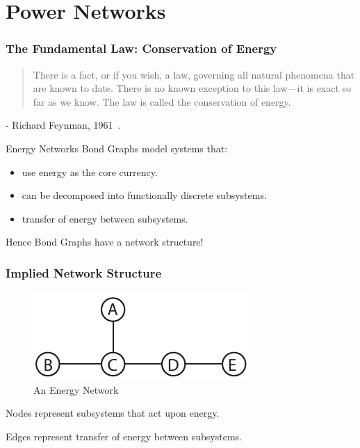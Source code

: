 \section{Power Networks}
\begin{frame}
\frametitle{The Fundamental Law: Conservation of Energy}
\begin{quotation}
	There is a fact, or if you wish, a law, governing all natural phenomena that are known to date. There is no known exception to this law—it is exact so far as we know. The law is called the conservation of energy.
\end{quotation}

- Richard Feynman, 1961~\cite{Feynman1961}.
\end{frame}
\begin{frame}{Energy Networks}
Bond Graphs model systems that:
\begin{itemize}
	\item use energy as the core currency.
	\item can be decomposed into functionally discrete subsystems.
	\item transfer of energy between subsystems.
\end{itemize}
\vspace{1cm}
Hence Bond Graphs have a network structure!
\end{frame}
\begin{frame}
\frametitle{Implied Network Structure}
\begin{figure}
	\centering
	\includegraphics{network_1.pdf}
	\caption{An Energy Network}
\end{figure}
Nodes represent subsystems that act upon energy.

\vspace{5pt}

Edges represent transfer of energy between subsystems.
\end{frame}

